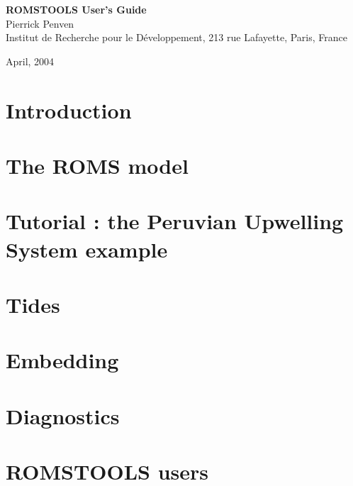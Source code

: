 \documentclass[10pt]{article}
\begin{document}
\setcounter{page}{0}
\pagestyle{empty}
\begin{center}
\vspace{3 cm}
{\huge \bf ROMSTOOLS User's Guide }\\
\vspace{2 cm}
{\Large Pierrick Penven}\\ 
\vspace{1 cm}
{\large Institut de Recherche pour le D\'eveloppement,
213 rue Lafayette, Paris,
France} \\
\vspace{2cm}
\centerline{}
\vspace{1cm}

{April, 2004}

\end{center}
\pagebreak
\setcounter{page}{0}
\tableofcontents
\pagebreak
\pagestyle{plain}

\section{Introduction}


\section{The ROMS model}


\section{Tutorial : the Peruvian Upwelling System example}


\section{Tides}


\section{Embedding}


\section{Diagnostics}


\section{ROMSTOOLS users}



\pagebreak
\begin{thebibliography}{}

\end{thebibliography}
\end{document}
